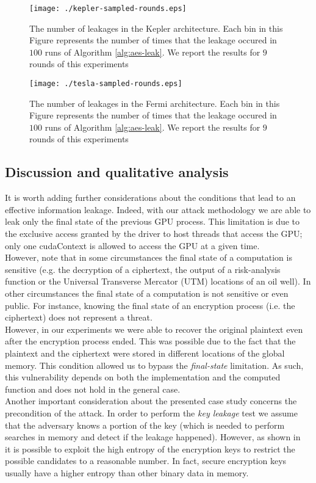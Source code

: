 \documentclass[11pt,onecolumn,letterpaper]{IEEEtran}
\begin{document}
\begin{figure}[t]
  \centering
  \texttt{[image: ./kepler-sampled-rounds.eps]}
  
  \caption{The number of leakages in the Kepler architecture. Each bin in this Figure represents the number of times that the leakage occured in $100$ runs of Algorithm \ref{alg:aes-leak}.
  We report the results for $9$ rounds of this experiments} 
  \label{fig:kepler-rounds}
\end{figure}

\begin{figure}[t]
  \centering
  \texttt{[image: ./tesla-sampled-rounds.eps]}
    \caption{The number of leakages in the Fermi architecture. Each bin in this Figure represents the number of times that the leakage occured in $100$ runs of Algorithm \ref{alg:aes-leak}.
  We report the results for $9$ rounds of this experiments}
  \label{fig:tesla-rounds}
\end{figure}


\subsection{Discussion and qualitative analysis}
\label{leakagequality2} 
It is worth adding further considerations about the conditions 
that lead to an effective information leakage. 
Indeed, with our attack methodology we are able to leak only the final state of the previous GPU process.  
This limitation is due to the exclusive access granted by the driver to host threads that access the GPU; only one 
cudaContext is allowed to access the GPU at a given time. \\
However, note that in some circumstances the final state of a computation is sensitive 
(e.g. the decryption of a ciphertext, the output of a risk-analysis function or the Universal Transverse Mercator (UTM) locations of an oil well). 
In other circumstances the final state of a computation is not sensitive or even public. 
For instance, knowing the final state of an encryption process (i.e. the ciphertext) does not represent a threat.\\ 
However, in our experiments we were able to recover the original plaintext even after the encryption process ended. 
This was possible due to the fact that the plaintext and the ciphertext were stored in different locations of the global memory. 
This condition allowed us to bypass the \emph{final-state} limitation.
As such, this vulnerability depends on both the implementation and the computed function and does not hold in the general case.\\
Another important consideration about the presented case study concerns the precondition of the attack. 
In order to perform the \emph{key leakage} test we assume that the adversary knows a portion of the key 
(which is needed to perform searches in memory and detect if the leakage happened). 
However, as shown in~\cite{coldboot,zeus} it is possible to exploit the high entropy of the encryption keys to restrict the possible candidates to a reasonable number.
In fact, secure encryption keys usually have a higher entropy than other binary data in memory.
\end{document}
